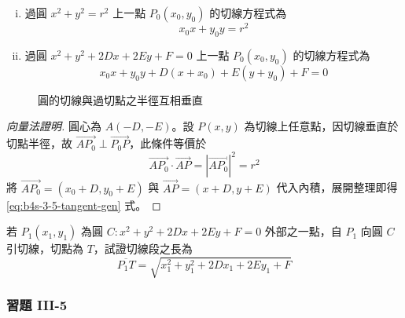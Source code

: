 \begin{theorem}[過圓上一點之切線方程式]
\begin{enumerate}[(i)]
  \item 過圓 $x^2 + y^2 = r^2$ 上一點 $P_0(x_0, y_0)$ 的切線方程式為
  \[ x_0 x + y_0 y = r^2 \]
  \item 過圓 $x^2 + y^2 + 2Dx + 2Ey + F = 0$ 上一點 $P_0(x_0, y_0)$ 的切線方程式為
  \begin{equation}
  x_0 x + y_0 y + D(x + x_0) + E(y + y_0) + F = 0 \label{eq:b4s-3-5-tangent-gen}
  \end{equation}
\end{enumerate}
\end{theorem}

\begin{figure}[htbp]
\centering
{}
\caption{圓的切線與過切點之半徑互相垂直}
\label{fig:b4s-3-36}
\end{figure}

\begin{proof}[向量法證明]
圓心為 $A(-D, -E)$。設 $P(x,y)$ 為切線上任意點，因切線垂直於切點半徑，故 $\vec{AP_0} \perp \vec{P_0P}$，此條件等價於
\[ \vec{AP_0} \cdot \vec{AP} = |\vec{AP_0}|^2 = r^2 \]
將 $\vec{AP_0} = (x_0 + D, y_0 + E)$ 與 $\vec{AP} = (x + D, y + E)$ 代入內積，展開整理即得 \eqref{eq:b4s-3-5-tangent-gen} 式。
\end{proof}

\begin{exercise}
若 $P_1(x_1, y_1)$ 為圓 $C : x^2 + y^2 + 2Dx + 2Ey + F = 0$ 外部之一點，自 $P_1$ 向圓 $C$ 引切線，切點為 $T$，試證切線段之長為
\[ \overline{P_1T} = \sqrt{x_1^2 + y_1^2 + 2Dx_1 + 2Ey_1 + F} \]
\end{exercise}

\subsubsection*{習題 III-5}


